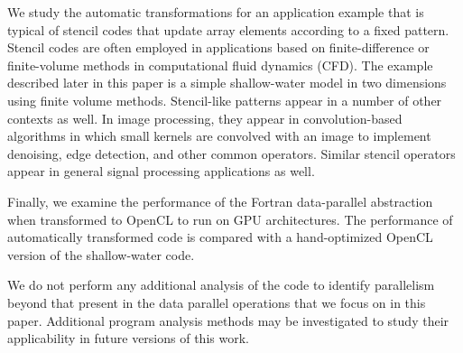 We study the automatic transformations for an application example that
is typical of stencil codes that update array elements according to a
fixed pattern.  Stencil codes are often employed in applications based
on finite-difference or finite-volume methods in computational fluid
dynamics (CFD).  The example described later in this paper is a simple
shallow-water model in two dimensions using finite volume methods.
Stencil-like patterns appear in a number of other contexts as well.
In image processing, they appear in convolution-based algorithms in
which small kernels are convolved with an image to implement
denoising, edge detection, and other common operators.  Similar
stencil operators appear in general signal processing applications as
well.

Finally, we examine the performance of the Fortran data-parallel abstraction
when transformed to OpenCL to run on GPU architectures.  The performance of
automatically transformed code is compared with a hand-optimized OpenCL
version of the shallow-water code.

We do not perform any additional analysis of the code to identify
parallelism beyond that present in the data parallel operations that we
focus on in this paper.  Additional program
analysis methods may be investigated to study their applicability
in future versions of this work.

